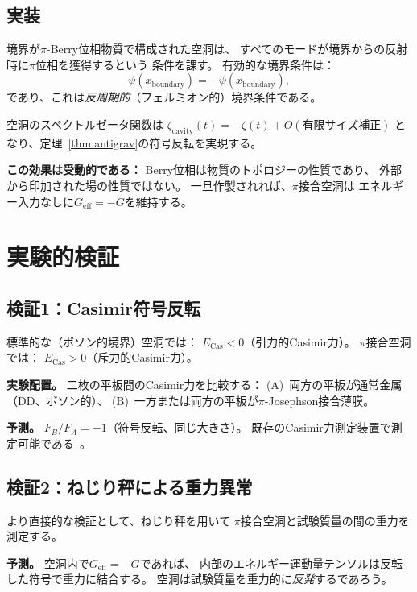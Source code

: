 \documentclass[11pt,a4paper,twocolumn]{article}
\begin{document}
\subsection{実装}

境界が$\pi$-Berry位相物質で構成された空洞は、
すべてのモードが境界からの反射時に$\pi$位相を獲得するという
条件を課す。
有効的な境界条件は：
\begin{equation}
  \psi(x_{\mathrm{boundary}}) = -\psi(x_{\mathrm{boundary}}),
\end{equation}
であり、これは\emph{反周期的}（フェルミオン的）境界条件である。

空洞のスペクトルゼータ関数は
$\zeta_{\mathrm{cavity}}(t) = -\zeta(t) + O(\text{有限サイズ補正})$
となり、定理~\ref{thm:antigrav}の符号反転を実現する。

\textbf{この効果は受動的である：}
Berry位相は物質のトポロジーの性質であり、
外部から印加された場の性質ではない。
一旦作製されれば、$\pi$接合空洞は
エネルギー入力なしに$G_{\mathrm{eff}} = -G$を維持する。

\section{実験的検証}

\subsection{検証1：Casimir符号反転}

標準的な（ボソン的境界）空洞では：
$E_{\mathrm{Cas}} < 0$（引力的Casimir力）。
$\pi$接合空洞では：
$E_{\mathrm{Cas}} > 0$（斥力的Casimir力）。

\textbf{実験配置。}
二枚の平板間のCasimir力を比較する：
(A)~両方の平板が通常金属（DD、ボソン的）、
(B)~一方または両方の平板が$\pi$-Josephson接合薄膜。

\textbf{予測。}
$F_B / F_A = -1$（符号反転、同じ大きさ）。
既存のCasimir力測定装置で測定可能である~\cite{Lamoreaux1997}。

\subsection{検証2：ねじり秤による重力異常}

より直接的な検証として、ねじり秤を用いて
$\pi$接合空洞と試験質量の間の重力を測定する。

\textbf{予測。}
空洞内で$G_{\mathrm{eff}} = -G$であれば、
内部のエネルギー運動量テンソルは反転した符号で重力に結合する。
空洞は試験質量を重力的に\emph{反発}するであろう。
\end{document}
